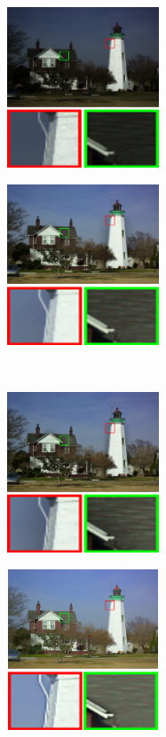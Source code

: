 \begin{figure}[htbp]
\centering
	\begin{minipage}[b]{0.49\hsize}
		\centering
		\includegraphics[width=60mm, height=48mm]{images/experiment/qualitative/comp1/input.eps}
		 \label{fig:qualitative/1/input}
	\end{minipage}
	\begin{minipage}[b]{0.49\hsize}
		\centering
		\includegraphics[width=60mm, height=48mm]{images/experiment/qualitative/comp1/srie.eps}
		 \label{fig:qualitative/1/srie}
	\end{minipage} \\
	\begin{minipage}[b]{0.49\hsize}
		\centering
		\includegraphics[width=60mm, height=48mm]{images/experiment/qualitative/comp1/wvm.eps}
		 \label{fig:qualitative/1/wvm}
	\end{minipage}
	\begin{minipage}[b]{0.49\hsize}
		\centering
		\includegraphics[width=60mm, height=48mm]{images/experiment/qualitative/comp1/rrm.eps}

\end{minipage}
\end{figure}
